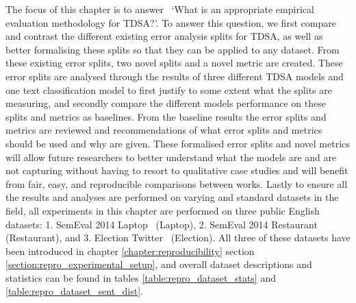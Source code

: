 The focus of this chapter is to answer~  `What is an appropriate empirical evaluation methodology for TDSA?'. To answer this question, we first compare and contrast the different existing error analysis splits for TDSA, as well as better formalising these splits so that they can be applied to any dataset. From these existing error splits, two novel splits and a novel metric are created. These error splits are analysed through the results of three different TDSA models and one text classification model to first justify to some extent what the splits are measuring, and secondly compare the different models performance on these splits and metrics as baselines. From the baseline results the error splits and metrics are reviewed and recommendations of what error splits and metrics should be used and why are given. 
These formalised error splits and novel metrics will allow future researchers to better understand what the models are and are not capturing without having to resort to qualitative case studies and will benefit from fair, easy, and reproducible comparisons between works. Lastly to ensure all the results and analyses are performed on varying and standard datasets in the field, all experiments in this chapter are performed on three public English datasets: 1. SemEval 2014 Laptop~\citep{pontiki-etal-2014-semeval} (Laptop), 2. SemEval 2014 Restaurant~\citep{pontiki-etal-2014-semeval} (Restaurant), and 3. Election Twitter~\citep{wang-etal-2017-tdparse} (Election). All three of these datasets have been introduced in chapter \ref{chapter:reproducibility} section \ref{section:repro_experimental_setup}, and overall dataset descriptions and statistics can be found in tables \ref{table:repro_dataset_stats} and \ref{table:repro_dataset_sent_dist}.

